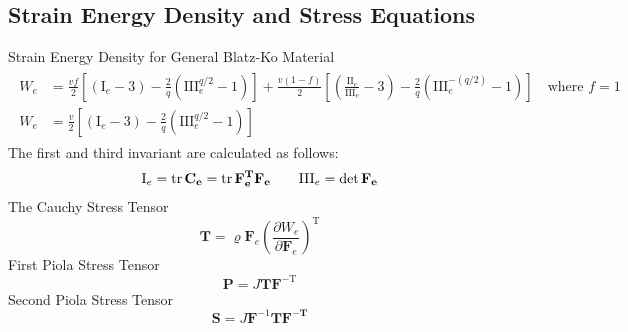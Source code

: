 \documentclass[12pt,3p]{article}
\numberwithin{equation}{section}
\begin{document}
\subsection{Strain Energy Density and Stress Equations}
Strain Energy Density for General Blatz-Ko Material 
\begin{align}\label{BlatzKo}
\begin{split}
W_{e} &= \frac{v f}{2} \left[ \left(\mathrm{I}_{e}-3\right) -\frac{2}{q} \left(\mathrm{III}_{e}^{q / 2}-1\right) \right] + \frac{v(1-f)}{2} \left[ \left( \frac{\mathrm{II}_{e}}{\mathrm{III}_{e}}-3 \right) - \frac{2}{q} \left( \mathrm{III}_{e}^{-(q / 2)}-1 \right) \right] \quad \text{where } f = 1 \\
W_{e} &= \frac{v}{2} \left[ \left(\mathrm{I}_{e}-3\right) -\frac{2}{q} \left(\mathrm{III}_{e}^{q / 2}-1\right) \right] 
\end{split}
\end{align}
The first and third invariant are calculated as follows:
\begin{align*}
\mathrm{I}_e = \tr \mathbf{C_e} = \tr \mathbf{F_e^T} \mathbf{F_e} \quad \quad \mathrm{III}_e = \det \mathbf{F_e}
\end{align*}
The Cauchy Stress Tensor 
\begin{equation}\label{CauchyStressTensor}
\mathbf{T}=\varrho \mathbf{F}_{e}\left(\frac{\partial W_{e}}{\partial \mathbf{F}_{e}}\right)^{\mathrm{T}}
\end{equation}
First Piola Stress Tensor
\begin{equation}\label{FirstPiolaStressTensor}
\mathbf{P}=J \mathbf{T} \mathbf{F}^{-\mathrm{T}}
\end{equation}
Second Piola Stress Tensor
\begin{equation}\label{SecondPiolaStressTensor}
\mathbf{S}=J \mathbf{F}^{-1} \mathbf{T} \mathbf{F}^{-\mathbf{T}}
\end{equation}

\end{document}
